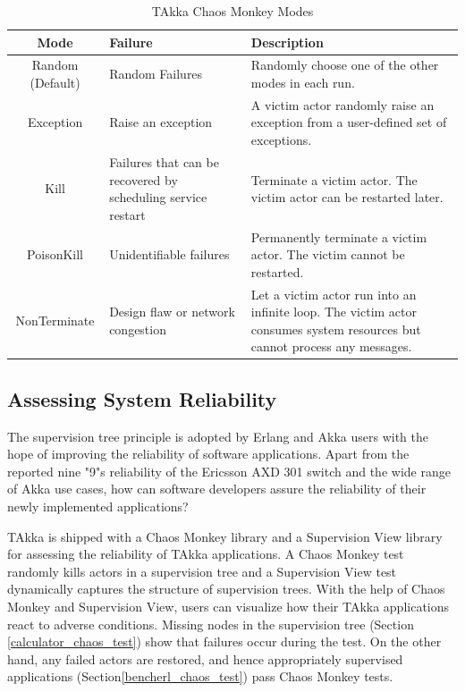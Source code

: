 \begin{table}[t]
\label{chaos}

\begin{center}
\begin{tabular}{| c | p{4.6 cm} | p{8 cm} | }
\hline
Mode & Failure & Description \\
\hline
Random (Default) & Random Failures & Randomly choose one of the other modes in 
each run. \\
\hline
Exception & Raise an exception & A victim actor randomly raise an exception 
from 
a user-defined set of exceptions. \\
\hline
Kill & Failures that can be recovered by scheduling service restart &  
Terminate 
a victim actor.  The victim actor can be restarted later. \\
\hline
PoisonKill & Unidentifiable failures & Permanently terminate a victim actor.  
The victim cannot be restarted.  \\ 
\hline 
NonTerminate & Design flaw or network congestion & Let a victim actor run 
into an infinite loop.  The victim actor consumes system resources but cannot 
process any messages. \\
\hline

\end{tabular}
\caption{TAkka Chaos Monkey Modes}
\end{center}
\end{table}



\subsection{Assessing System Reliability}
\label{reliability}

The supervision tree principle is adopted by Erlang and Akka users with the 
hope of improving the reliability of software applications.  Apart from the 
reported nine "9"s reliability of the Ericsson AXD 301 switch 
\cite{ArmstrongAXD} and the wide range of Akka use cases, how can software 
developers assure the reliability of their newly implemented applications?  

TAkka is shipped with a Chaos Monkey library and a Supervision View library for 
assessing the reliability of TAkka applications.  A Chaos Monkey test randomly 
kills actors in a supervision tree and a Supervision View test dynamically 
captures the structure of supervision trees.  With the help of Chaos Monkey and 
Supervision View, users can visualize how their TAkka applications react to 
adverse conditions. Missing nodes in the supervision tree (Section 
\ref{calculator_chaos_test}) show that failures occur during the test. On the 
other hand, any failed actors are restored, and hence appropriately supervised 
applications (Section\ref{bencherl_chaos_test})  pass Chaos Monkey tests.

